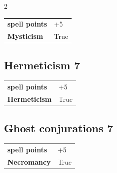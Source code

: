\begin{multicols}{2}
\begin{tcolorbox}
\begin{tabular}{@{}ll@{}}
    \textbf{spell points} & +5\\
    \textbf{Mysticism} & True\\
\end{tabular}


\end{tcolorbox}

\begin{tcolorbox}
    \subsection*{Hermeticism \hfill \small{7 }}
    \tcblower




\begin{tabular}{@{}ll@{}}
    \textbf{spell points} & +5\\
    \textbf{Hermeticism} & True\\
\end{tabular}


\end{tcolorbox}

\begin{tcolorbox}
    \subsection*{Ghost conjurations \hfill \small{7 }}
    \tcblower




\begin{tabular}{@{}ll@{}}
    \textbf{spell points} & +5\\
    \textbf{Necromancy} & True\\
\end{tabular}


\end{tcolorbox}

\begin{tcolorbox}

\end{tcolorbox}
\end{multicols}
